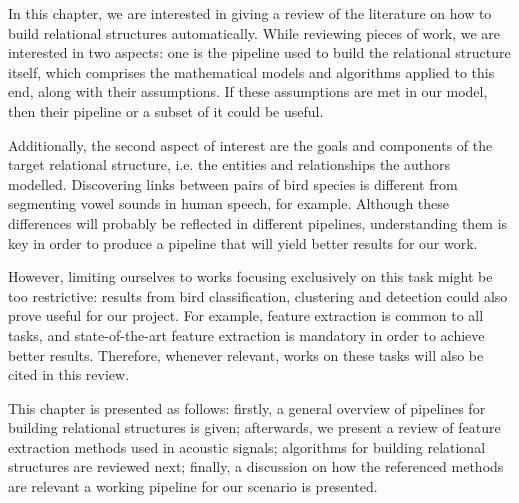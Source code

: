 \documentclass[../main.tex]{subfiles} \label{chapter_soa}
\begin{document}
In this chapter, we are interested in giving a review of the literature on how to build relational structures automatically. While reviewing pieces of work, we are interested in two aspects: one is the pipeline used to build the relational structure itself, which comprises the mathematical models and algorithms applied to this end, along with their assumptions. If these assumptions are met in our model, then their pipeline or a subset of it could be useful.
\par Additionally, the second aspect of interest are the goals and components of the target relational structure, i.e. the entities and relationships the authors modelled. Discovering links between pairs of bird species is different from segmenting vowel sounds in human speech, for example. Although these differences will probably be reflected in different pipelines, understanding them is key in order to produce a pipeline that will yield better results for our work.
\par However, limiting ourselves to works focusing exclusively on this task might be too restrictive: results from bird classification, clustering and detection could also prove useful for our project. For example, feature extraction is common to all tasks, and state-of-the-art feature extraction is mandatory in order to achieve better results. Therefore, whenever relevant, works on these tasks will also be cited in this review.
\par This chapter is presented as follows: firstly, a general overview of pipelines for building relational structures is given; afterwards, we present a review of feature extraction methods used in acoustic signals; algorithms for building relational structures are reviewed next; finally, a discussion on how the referenced methods are relevant a working pipeline for our scenario is presented.
\end{document}

